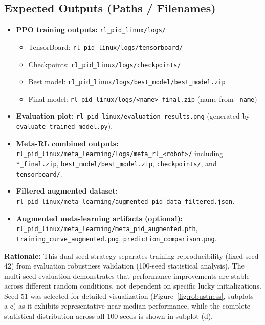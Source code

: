 \documentclass[a4paper]{cas-sc}
\begin{document}
\subsection{Expected Outputs (Paths / Filenames)}
\begin{itemize}[leftmargin=*, itemsep=2pt]
    \item \textbf{PPO training outputs:} \texttt{rl\_pid\_linux/logs/}
    \begin{itemize}[leftmargin=*, itemsep=1pt]
        \item TensorBoard: \texttt{rl\_pid\_linux/logs/tensorboard/}
        \item Checkpoints: \texttt{rl\_pid\_linux/logs/checkpoints/}
        \item Best model: \texttt{rl\_pid\_linux/logs/best\_model/best\_model.zip}
        \item Final model: \texttt{rl\_pid\_linux/logs/<name>\_final.zip} (name from \texttt{--name})
    \end{itemize}
    \item \textbf{Evaluation plot:} \texttt{rl\_pid\_linux/evaluation\_results.png} (generated by \texttt{evaluate\_trained\_model.py}).
    \item \textbf{Meta-RL combined outputs:} \texttt{rl\_pid\_linux/meta\_learning/logs/meta\_rl\_<robot>/} including \texttt{*\_final.zip}, \texttt{best\_model/best\_model.zip}, \texttt{checkpoints/}, and \texttt{tensorboard/}.
    \item \textbf{Filtered augmented dataset:} \texttt{rl\_pid\_linux/meta\_learning/augmented\_pid\_data\_filtered.json}.
    \item \textbf{Augmented meta-learning artifacts (optional):} \texttt{rl\_pid\_linux/meta\_learning/meta\_pid\_augmented.pth}, \texttt{training\_curve\_augmented.png}, \texttt{prediction\_comparison.png}.
\end{itemize}

\vspace{0.3cm}

\noindent
\textbf{Rationale:} This dual-seed strategy separates training reproducibility (fixed seed 42) from evaluation robustness validation (100-seed statistical analysis). The multi-seed evaluation demonstrates that performance improvements are stable across different random conditions, not dependent on specific lucky initializations. Seed 51 was selected for detailed visualization (Figure~\ref{fig:robustness}, subplots a-c) as it exhibits representative near-median performance, while the complete statistical distribution across all 100 seeds is shown in subplot (d).
\end{document}
